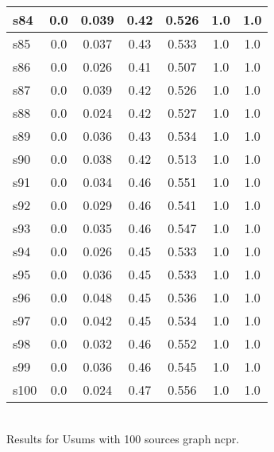 \documentclass{article}
\begin{document}
\begin{tabular}{|l|c|c|c|c|c|c|}
\hline
s84 &0.0 & 0.039 & 0.42 & 0.526 & 1.0 & 1.0\\
\hline
s85 &0.0 & 0.037 & 0.43 & 0.533 & 1.0 & 1.0\\
\hline
s86 &0.0 & 0.026 & 0.41 & 0.507 & 1.0 & 1.0\\
\hline
s87 &0.0 & 0.039 & 0.42 & 0.526 & 1.0 & 1.0\\
\hline
s88 &0.0 & 0.024 & 0.42 & 0.527 & 1.0 & 1.0\\
\hline
s89 &0.0 & 0.036 & 0.43 & 0.534 & 1.0 & 1.0\\
\hline
s90 &0.0 & 0.038 & 0.42 & 0.513 & 1.0 & 1.0\\
\hline
s91 &0.0 & 0.034 & 0.46 & 0.551 & 1.0 & 1.0\\
\hline
s92 &0.0 & 0.029 & 0.46 & 0.541 & 1.0 & 1.0\\
\hline
s93 &0.0 & 0.035 & 0.46 & 0.547 & 1.0 & 1.0\\
\hline
s94 &0.0 & 0.026 & 0.45 & 0.533 & 1.0 & 1.0\\
\hline
s95 &0.0 & 0.036 & 0.45 & 0.533 & 1.0 & 1.0\\
\hline
s96 &0.0 & 0.048 & 0.45 & 0.536 & 1.0 & 1.0\\
\hline
s97 &0.0 & 0.042 & 0.45 & 0.534 & 1.0 & 1.0\\
\hline
s98 &0.0 & 0.032 & 0.46 & 0.552 & 1.0 & 1.0\\
\hline
s99 &0.0 & 0.036 & 0.46 & 0.545 & 1.0 & 1.0\\
\hline
s100 &0.0 & 0.024 & 0.47 & 0.556 & 1.0 & 1.0\\
\hline
\end{tabular}\\

\noindent Results for Usums with 100 sources graph ncpr.
\end{document}

